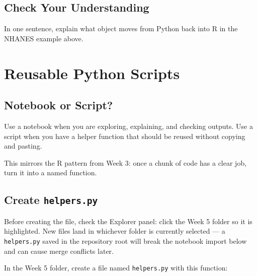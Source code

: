\documentclass[
  letterpaper,
  DIV=11,
  numbers=noendperiod,
  oneside]{scrreprt}
\begin{document}
\section{Check Your Understanding}\label{check-your-understanding-1}

In one sentence, explain what object moves from Python back into R in
the NHANES example above.

\chapter{Reusable Python Scripts}\label{reusable-python-scripts}

\section{Notebook or Script?}\label{notebook-or-script}

Use a notebook when you are exploring, explaining, and checking outputs.
Use a script when you have a helper function that should be reused
without copying and pasting.

This mirrors the R pattern from Week 3: once a chunk of code has a clear
job, turn it into a named function.

\section{\texorpdfstring{Create
\texttt{helpers.py}}{Create helpers.py}}\label{create-helpers.py}

Before creating the file, check the Explorer panel: click the Week 5
folder so it is highlighted. New files land in whichever folder is
currently selected --- a \texttt{helpers.py} saved in the repository
root will break the notebook import below and can cause merge conflicts
later.

In the Week 5 folder, create a file named \texttt{helpers.py} with this
function:
\end{document}
